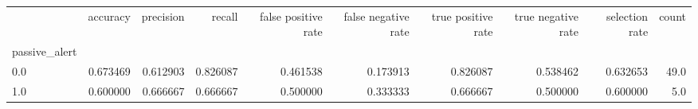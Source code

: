 \begin{tabular}{lrrrrrrrrr}
\toprule
{} &  accuracy &  precision &    recall &  false positive rate &  false negative rate &  true positive rate &  true negative rate &  selection rate &  count \\
passive\_alert &           &            &           &                      &                      &                     &                     &                 &        \\
\midrule
0.0           &  0.673469 &   0.612903 &  0.826087 &             0.461538 &             0.173913 &            0.826087 &            0.538462 &        0.632653 &   49.0 \\
1.0           &  0.600000 &   0.666667 &  0.666667 &             0.500000 &             0.333333 &            0.666667 &            0.500000 &        0.600000 &    5.0 \\
\bottomrule
\end{tabular}
